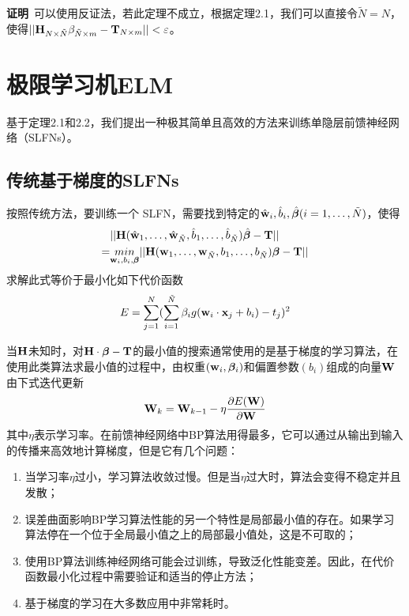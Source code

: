 \documentclass[conference]{IEEEtran}
\begin{document}
\textbf{证明}\ 可以使用反证法，若此定理不成立，根据定理2.1，我们可以直接令${\tilde{N}=N}$，使得$||{\bf H}_{N\times \tilde{N}}\beta_{\tilde{N}\times m}-{\bf T}_{N\times m}||<\varepsilon$。\square


\section{极限学习机ELM}

基于定理2.1和2.2，我们提出一种极其简单且高效的方法来训练单隐层前馈神经网络（SLFNs）。

\subsection{传统基于梯度的SLFNs}

按照传统方法，要训练一个 SLFN，需要找到特定的$\hat{\bf{w}}_i,\hat b_i,\hat{\bm{\beta}}(i=1,\dots,\tilde{N})$，使得
\begin{equation}\label{eq9}
	\begin{split}
		&||{\bf{H}}(\hat{\bf{w}}_1,\dots,\hat{\bf{w}}_{\tilde{N}},\hat b_1,\dots,\hat b_{\tilde{N}})\hat{\bm{\beta}}-{\bf{T}}||\\
		=&\underset{{\bf{w}}_i,b_i,{\bm \beta}}{min}||{\bf{H}}({\bf{w}}_1,\dots,{\bf{w}}_{\tilde{N}},b_1,\dots,b_{\tilde{N}}){\bm{\beta}}-{\bf{T}}||
	\end{split}
\end{equation}
求解此式等价于最小化如下代价函数
\begin{equation}\label{eq10}
	E=\sum_{j=1}^N(\sum_{i=1}^{\tilde{N}}\beta_i g({\bf{w}}_i\cdot{\bf{x}}_j+b_i)-t_j)^2
\end{equation}

当${\bf H}$未知时，对${\bf{H}}\cdot{\bm{\beta}}-{\bf{T}}$的最小值的搜索通常使用的是基于梯度的学习算法，在使用此类算法求最小值的过程中，由权重$({\bf w}_i, {\bm \beta}_i)$和偏置参数$(b_i)$组成的向量${\bf W}$由下式迭代更新
\begin{equation}\label{eq11}
	{\bf{W}}_k={\bf{W}}_{k-1}-\eta \frac{\partial E({\bf{W}})}{\partial {\bf{W}}}
\end{equation}
其中$\eta$表示学习率。在前馈神经网络中BP算法用得最多，它可以通过从输出到输入的传播来高效地计算梯度，但是它有几个问题：
\begin{enumerate}
	\item 当学习率$\eta$过小，学习算法收敛过慢。但是当$\eta$过大时，算法会变得不稳定并且发散；
	\item 误差曲面影响BP学习算法性能的另一个特性是局部最小值的存在。如果学习算法停在一个位于全局最小值之上的局部最小值处，这是不可取的；
	\item 使用BP算法训练神经网络可能会过训练，导致泛化性能变差。因此，在代价函数最小化过程中需要验证和适当的停止方法；
	\item 基于梯度的学习在大多数应用中非常耗时。
\end{enumerate}
\end{document}
